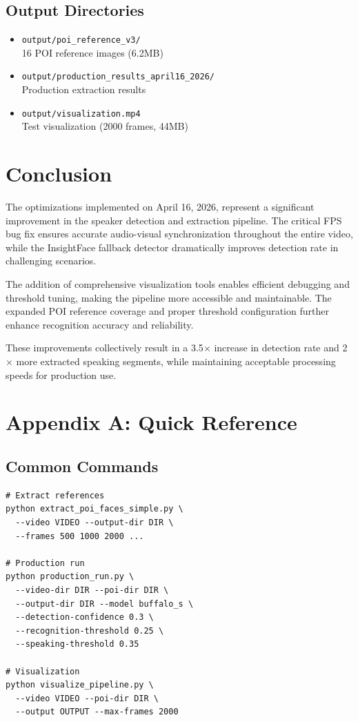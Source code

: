 \documentclass[11pt,a4paper]{article}
\begin{document}
\subsection{Output Directories}
\begin{itemize}
    \item \texttt{output/poi\_reference\_v3/}\\
    16 POI reference images (6.2MB)
    \item \texttt{output/production\_results\_april16\_2026/}\\
    Production extraction results
    \item \texttt{output/visualization.mp4}\\
    Test visualization (2000 frames, 44MB)
\end{itemize}

\section{Conclusion}

The optimizations implemented on April 16, 2026, represent a significant improvement in the speaker detection and extraction pipeline. The critical FPS bug fix ensures accurate audio-visual synchronization throughout the entire video, while the InsightFace fallback detector dramatically improves detection rate in challenging scenarios.

The addition of comprehensive visualization tools enables efficient debugging and threshold tuning, making the pipeline more accessible and maintainable. The expanded POI reference coverage and proper threshold configuration further enhance recognition accuracy and reliability.

These improvements collectively result in a 3.5$\times$ increase in detection rate and 2$\times$ more extracted speaking segments, while maintaining acceptable processing speeds for production use.

\section*{Appendix A: Quick Reference}

\subsection*{Common Commands}

\begin{lstlisting}[style=bashcode]
# Extract references
python extract_poi_faces_simple.py \
  --video VIDEO --output-dir DIR \
  --frames 500 1000 2000 ...

# Production run
python production_run.py \
  --video-dir DIR --poi-dir DIR \
  --output-dir DIR --model buffalo_s \
  --detection-confidence 0.3 \
  --recognition-threshold 0.25 \
  --speaking-threshold 0.35

# Visualization
python visualize_pipeline.py \
  --video VIDEO --poi-dir DIR \
  --output OUTPUT --max-frames 2000
\end{lstlisting}
\end{document}
